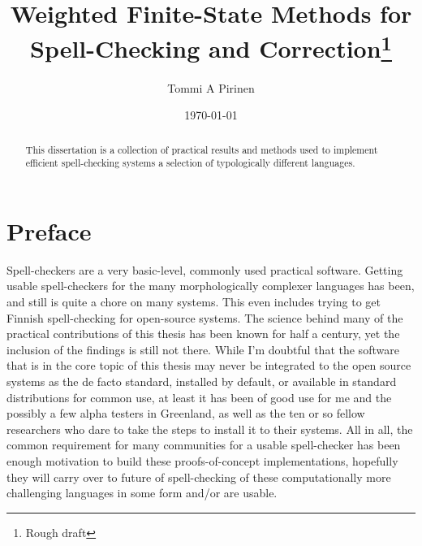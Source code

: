 \documentclass[officiallayout]{unihelcompling}
\title{Weighted Finite-State Methods for 
Spell-Checking
and Correction\footnote{Rough draft}}
\author{Tommi A Pirinen}
\date{\today}
\begin{document}
\frontmatter

\maketitle

\begin{abstract}
    This dissertation is a collection of practical results and methods used
    to implement efficient spell-checking systems a selection of typologically
    different languages.
\end{abstract}

\tableofcontents

\listoftodos

\mainmatter

\chapter*{Preface}
\label{chap:preface}

Spell-checkers are a very basic-level, commonly used practical software.
Getting usable spell-checkers for the many morphologically complexer languages
has been, and still is quite a chore on many systems. This even includes trying
to get Finnish spell-checking for open-source systems. The science behind many
of the practical contributions of this thesis has been known for half a
century, yet the inclusion of the findings is still not there.  While I'm
doubtful that the software that is in the core topic of this thesis may never
be integrated to the open source systems as the de facto standard, installed by
default, or available in standard distributions for common use, at least it has
been of good use for me and the possibly a few alpha testers in Greenland, as
well as the ten or so fellow researchers who dare to take the steps to install
it to their systems.  All in all, the common requirement for many communities
for a usable spell-checker has been enough motivation to build these
proofs-of-concept implementations, hopefully they will carry over to future of
spell-checking of these computationally more challenging languages in some form
and/or are usable.
\end{document}
